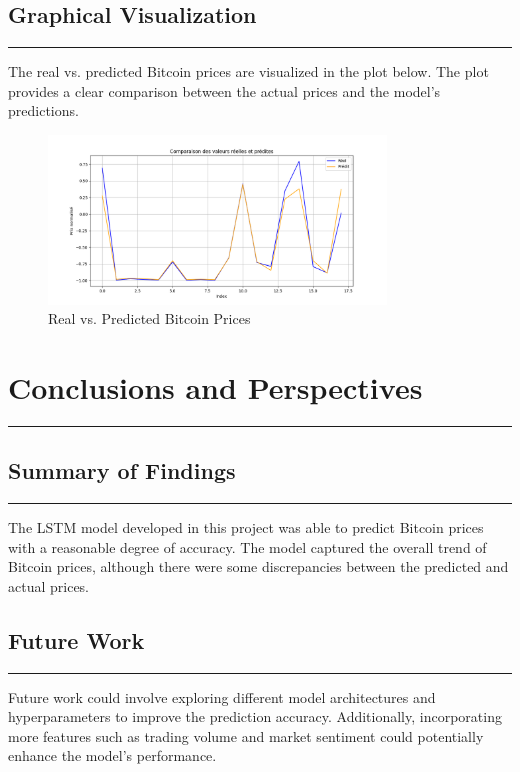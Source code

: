 \documentclass{article}
\begin{document}
\subsection{Graphical Visualization}
\noindent\rule{\textwidth}{1pt} %
The real vs. predicted Bitcoin prices are visualized in the plot below. The plot provides a clear comparison between the actual prices and the model's predictions.

\begin{figure}[h]
    \centering
    \includegraphics[width=0.8\textwidth]{img/Prediction.png}
    \caption{Real vs. Predicted Bitcoin Prices} %
    \label{fig:predictions}
\end{figure}

\section{Conclusions and Perspectives}
\noindent\rule{\textwidth}{1pt} %
\subsection{Summary of Findings}
\noindent\rule{\textwidth}{1pt} %
The LSTM model developed in this project was able to predict Bitcoin prices with a reasonable degree of accuracy. The model captured the overall trend of Bitcoin prices, although there were some discrepancies between the predicted and actual prices.

\subsection{Future Work}
\noindent\rule{\textwidth}{1pt} %
Future work could involve exploring different model architectures and hyperparameters to improve the prediction accuracy. Additionally, incorporating more features such as trading volume and market sentiment could potentially enhance the model's performance.
\end{document}
